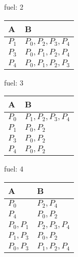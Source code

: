     \begin{minipage}[t]{0.30\textwidth}
        fuel: 2\\
    \begin{tabular}{l|l}
        A & B \\\hline
        $P_1$ & $P_0, P_2, P_3, P_4$ \\
        $P_3$ & $P_0, P_1, P_2, P_4$ \\
        $P_4$ & $P_0, P_1, P_2, P_3$ \\
    \end{tabular}
    \end{minipage}
    \hfill
    \begin{minipage}[t]{0.30\textwidth}
        fuel: 3\\
    \begin{tabular}{l|l}
        A & B \\\hline
        $P_0$ & $P_1, P_2, P_3, P_4$ \\
        $P_1$ & $P_0, P_2$ \\
        $P_3$ & $P_0, P_2$ \\
        $P_4$ & $P_0, P_2$ \\
    \end{tabular}
    \end{minipage}
    \hfill
    \begin{minipage}[t]{0.30\textwidth}
        fuel: 4\\
    \begin{tabular}{l|l}
        A & B \\\hline
        $P_0$ & $P_2, P_4$ \\
        $P_4$ & $P_0, P_2$ \\
        $P_0, P_1$ & $P_2, P_3, P_4$ \\
        $P_1, P_3$ & $P_0, P_2$ \\
        $P_0, P_3$ & $P_1, P_2, P_4$ \\
    \end{tabular}
    \end{minipage}

